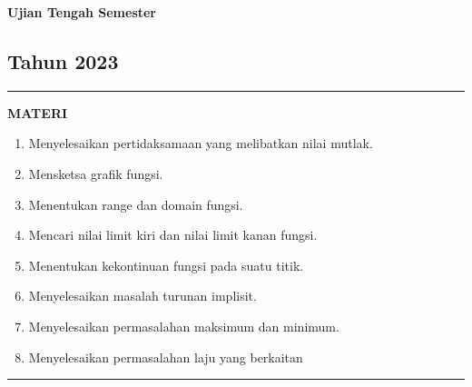 \begin{flushright}
    \textbf{\Large{Ujian Tengah Semester}}
    \subsection*{Tahun 2023}
\end{flushright}


\vspace{0.5cm}\hrule height 2pt\vspace{0.5cm}


\begin{center}
\textbf{\large{MATERI}}
\begin{enumerate}[leftmargin=*, label={\arabic*}.]
\item Menyelesaikan pertidaksamaan yang melibatkan nilai mutlak.
\item Mensketsa grafik fungsi.
\item Menentukan range dan domain fungsi.
\item Mencari nilai limit kiri dan nilai limit kanan fungsi.
\item Menentukan kekontinuan fungsi pada suatu titik.
\item Menyelesaikan masalah turunan implisit.
\item Menyelesaikan permasalahan maksimum dan minimum.
\item Menyelesaikan permasalahan laju yang berkaitan
\end{enumerate}
\end{center}


\vspace{0.2cm}\hrule height 1pt\vspace{0.5cm}


